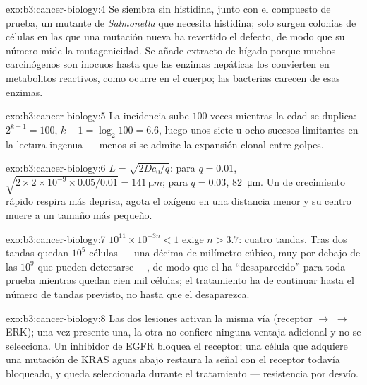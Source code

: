 \begin{solution}{exo:b3:cancer-biology:4}
Se siembra sin histidina, junto con el compuesto de prueba, un mutante de
\emph{Salmonella} que necesita histidina; solo surgen colonias de células
en las que una mutación nueva ha revertido el defecto, de modo que su
número mide la mutagenicidad. Se añade extracto de hígado porque muchos
carcinógenos son inocuos hasta que las enzimas hepáticas los convierten
en metabolitos reactivos, como ocurre en el cuerpo; las bacterias carecen
de esas enzimas.
\end{solution}

\begin{solution}{exo:b3:cancer-biology:5}
La incidencia sube $100$ veces mientras la edad se duplica:
$2^{k-1} = 100$, $k - 1 =
\log_{2}100 = 6.6$, luego unos siete u ocho sucesos limitantes en la
lectura ingenua --- menos si se admite la expansión clonal entre golpes.
\end{solution}

\begin{solution}{exo:b3:cancer-biology:6}
$L = \sqrt{2Dc_{0}/q}$: para $q = 0.01$, $\sqrt{2\times 2\times 10^{-9}
\times 0.05/0.01} = \qty{141}{\micro m}$; para $q = 0.03$,
\qty{82}{\micro m}. Un  de crecimiento rápido respira más deprisa,
agota el oxígeno en una distancia menor y su centro muere a un tamaño más
pequeño.
\end{solution}

\begin{solution}{exo:b3:cancer-biology:7}
$10^{11}\times 10^{-3n} < 1$ exige $n > 3.7$: cuatro tandas. Tras dos
tandas quedan $10^{5}$ células --- una décima de milímetro cúbico, muy
por debajo de las $10^{9}$ que pueden detectarse ---, de modo que el
 ha ``desaparecido'' para toda prueba mientras quedan cien mil
células; el tratamiento ha de continuar hasta el número de tandas
previsto, no hasta que el  desaparezca.
\end{solution}

\begin{solution}{exo:b3:cancer-biology:8}
Las dos lesiones activan la misma vía (receptor $\to$  $\to$ ERK); una
vez presente una, la otra no confiere ninguna ventaja adicional y no se
selecciona. Un inhibidor de EGFR bloquea el receptor; una célula que
adquiere una mutación de KRAS aguas abajo restaura la señal con el
receptor todavía bloqueado, y queda seleccionada durante el tratamiento
--- resistencia por desvío.
\end{solution}

